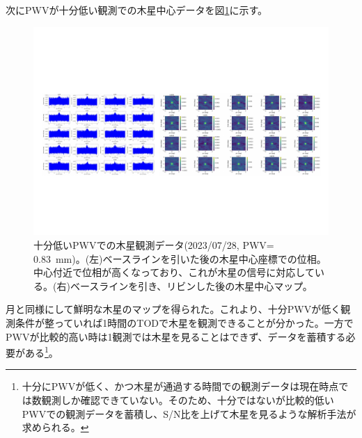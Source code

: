 次にPWVが十分低い観測での木星中心データを図\ref{5987_jupiter}に示す。
\begin{figure}[htbp]
  \centering
  \includegraphics[width=1.0\columnwidth]{5_alignment/figs/5987_jupiter.pdf}
  \caption{十分低いPWVでの木星観測データ(2023/07/28, PWV= \SI{0.83}{mm})。(左)ベースラインを引いた後の木星中心座標での位相。中心付近で位相が高くなっており、これが木星の信号に対応している。(右)ベースラインを引き、リビンした後の木星中心マップ。}
  \label{5987_jupiter}
\end{figure}
月と同様にして鮮明な木星のマップを得られた。これより、十分PWVが低く観測条件が整っていれば1時間のTODで木星を観測できることが分かった。一方でPWVが比較的高い時は1観測では木星を見ることはできず、データを蓄積する必要がある\footnote{十分にPWVが低く、かつ木星が通過する時間での観測データは現在時点では数観測しか確認できていない。そのため、十分ではないが比較的低いPWVでの観測データを蓄積し、S/N比を上げて木星を見るような解析手法が求められる。}。

